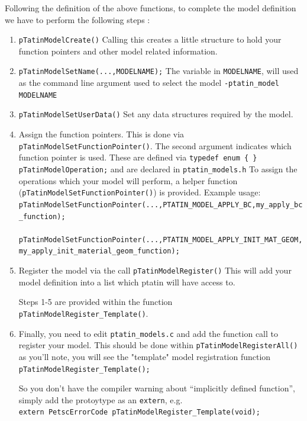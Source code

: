 \documentclass[paper=a4, fontsize=11pt,twoside]{scrartcl}
\newcommand{\shellcmd}[1]{\\\indent\indent\texttt{\hspace{5mm}\footnotesize #1}\\}
\newcommand{\unix}[1]{\texttt{\footnotesize #1}}
\begin{document}
{{Following the definition of the above functions, to complete the model definition we have to perform the following steps :
\begin{enumerate}
	\item \unix{pTatinModelCreate()}
Calling this creates a little structure to hold your function pointers and other model related information.

	\item \unix{pTatinModelSetName(...,MODELNAME);}
The variable in \unix{MODELNAME}, will used as the command line argument used to select the model
	\unix{-ptatin\_model MODELNAME}

	\item \unix{pTatinModelSetUserData()}
Set any data structures required by the model.

	\item Assign the function pointers. This is done via \unix{pTatinModelSetFunctionPointer()}.
The second argument indicates which function pointer is used. These are defined via
\unix{typedef enum \{ \} pTatinModelOperation;}
and are declared in 
\unix{ptatin\_models.h}
To assign the operations which your model will perform, a helper function (\unix{pTatinModelSetFunctionPointer()}) is provided.
Example usage:
\shellcmd{pTatinModelSetFunctionPointer(...,PTATIN\_MODEL\_APPLY\_BC,my\_apply\_bc\_function);}
\shellcmd{pTatinModelSetFunctionPointer(...,PTATIN\_MODEL\_APPLY\_INIT\_MAT\_GEOM,my\_apply\_init\_material\_geom\_function);}

	\item Register the model via the call
\unix{pTatinModelRegister()}
This will add your model definition into a list which ptatin will have access to.

Steps 1-5 are provided within the function \unix{pTatinModelRegister\_Template()}.

	\item Finally, you need to edit
	\unix{ptatin\_models.c}
and add the function call to register your model.
This should be done within
		\unix{pTatinModelRegisterAll()}
as you'll note, you will see the "template" model registration function 	
		\unix{pTatinModelRegister\_Template();}

So you don't have the compiler warning about ``implicitly defined function'', simply add the protoytype as an \unix{extern}, e.g.
	\shellcmd{extern PetscErrorCode pTatinModelRegister\_Template(void);}
\end{enumerate}

}}
\end{document}
